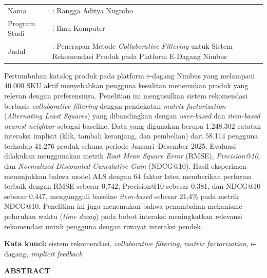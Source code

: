\documentclass[12pt,a4paper]{report}
\begin{document}
\begin{singlespace}
\noindent
\begin{tabularx}{\textwidth}{@{}p{2.6cm}X@{}}
Nama & : Rangga Aditya Nugroho \\
Program Studi & : Ilmu Komputer \\
Judul & : Penerapan Metode \emph{Collaborative Filtering} untuk Sistem
  Rekomendasi Produk pada Platform E-Dagang Nimbus \\
\end{tabularx}

\vspace{0.5cm}
\noindent
Pertumbuhan katalog produk pada platform e-dagang Nimbus yang melampaui
40.000 SKU aktif menyebabkan pengguna kesulitan menemukan produk yang
relevan dengan preferensinya. Penelitian ini mengusulkan sistem rekomendasi
berbasis \emph{collaborative filtering} dengan pendekatan \emph{matrix
factorization} (\emph{Alternating Least Squares}) yang dibandingkan dengan
\emph{user-based} dan \emph{item-based nearest neighbor} sebagai baseline.
Data yang digunakan berupa 1.248.302 catatan interaksi implisit (klik,
tambah keranjang, dan pembelian) dari 58.114 pengguna terhadap 41.276 produk
selama periode Januari--Desember 2025. Evaluasi dilakukan menggunakan
metrik \emph{Root Mean Square Error} (RMSE), \emph{Precision@10}, dan
\emph{Normalized Discounted Cumulative Gain} (NDCG@10). Hasil eksperimen
menunjukkan bahwa model ALS dengan 64 faktor laten memberikan performa
terbaik dengan RMSE sebesar 0,742, Precision@10 sebesar 0,381, dan NDCG@10
sebesar 0,447, mengungguli baseline \emph{item-based} sebesar 21,4\% pada
metrik NDCG@10. Penelitian ini juga menemukan bahwa penambahan mekanisme
peluruhan waktu (\emph{time decay}) pada bobot interaksi meningkatkan
relevansi rekomendasi untuk pengguna dengan riwayat interaksi pendek.

\vspace{0.4cm}
\noindent
\textbf{Kata kunci:} sistem rekomendasi, \emph{collaborative filtering},
\emph{matrix factorization}, e-dagang, \emph{implicit feedback}
\end{singlespace}

\newpage
\thispagestyle{plain}
\begin{center}
{\bfseries\color{uinavy}\large ABSTRACT}
\end{center}
\vspace{0.4cm}
\end{document}
